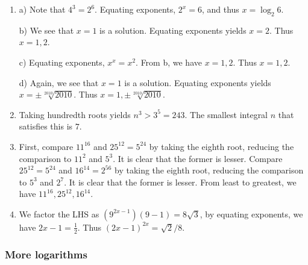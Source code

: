\documentclass[10pt,paper=letter]{scrartcl}
\begin{document}
\begin{enumerate}

\item a) Note that $4^3 = 2^6$. Equating exponents, $2^x = 6$, and thus $x = \log_2 6$.

b) We see that $x = 1$ is a solution. Equating exponents yields $x = 2$. Thus $x = 1, 2$.

c) Equating exponents, $x^x = x^2$. From b, we have $x = 1, 2$. Thus $x = 1, 2$.

d) Again, we see that $x = 1$ is a solution. Equating exponents yields $x = \pm \sqrt[2010]{2010}$. Thus $x = 1, \pm \sqrt[2010]{2010}$.

\item Taking hundredth roots yields $n^3 > 3^5 = 243$. The smallest integral $n$ that satisfies this is $7$.

\item First, compare $11^{16}$ and $25^{12} = 5^{24}$ by taking the eighth root, reducing the comparison to $11^2$ and $5^3$. It is clear that the former is lesser. Compare $25^{12} = 5^{24}$ and $16^{14} = 2^{56}$ by taking the eighth root, reducing the comparison to $5^3$ and $2^7$. It is clear that the former is lesser. From least to greatest, we have $11^{16}, 25^{12}, 16^{14}$.

\item We factor the LHS as $(9^{2x-1})(9 - 1) = 8\sqrt{3}$, by equating exponents, we have $2x - 1 = \frac{1}{2}$. Thus $(2x - 1)^{2x} = \sqrt{2}/8$.

\end{enumerate}

\subsubsection*{More logarithms}
\end{document}
